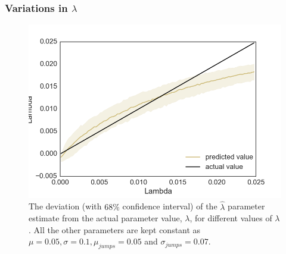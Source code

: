\documentclass[11pt,oneside,openany,a4paper,english, report, goldenblock
]{usthesis}
\begin{document}
\subsubsection{Variations in $\lambda$}

\begin{figure}[h]
	\centering
	\includegraphics[width=0.7\linewidth]{Images/Output-Sensitivity-Results/ConvolutionalNN-MultipleOutput-ELU/Varying-Lambda/Lambda}
	\caption{The deviation (with $68\%$ confidence interval) of the $\hat{\lambda}$ parameter estimate from the actual parameter value, $\lambda$, for different values of $\lambda$. All the other parameters are kept constant as $\mu = 0.05, \sigma = 0.1, \mu_{jumps} = 0.05$ and $\sigma_{jumps} = 0.07$.}
	\label{fig:sensitivity_test:multiple_output:varying_lambda:lambda}
\end{figure}
\end{document}
